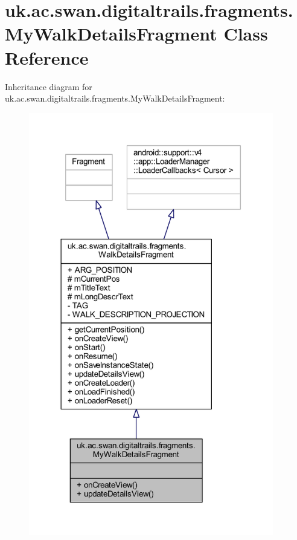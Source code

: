 \hypertarget{classuk_1_1ac_1_1swan_1_1digitaltrails_1_1fragments_1_1_my_walk_details_fragment}{\section{uk.\+ac.\+swan.\+digitaltrails.\+fragments.\+My\+Walk\+Details\+Fragment Class Reference}
\label{classuk_1_1ac_1_1swan_1_1digitaltrails_1_1fragments_1_1_my_walk_details_fragment}
}


Inheritance diagram for uk.\+ac.\+swan.\+digitaltrails.\+fragments.\+My\+Walk\+Details\+Fragment\+:
\nopagebreak
\begin{figure}[H]
\begin{center}
\leavevmode
\includegraphics[width=303pt]{classuk_1_1ac_1_1swan_1_1digitaltrails_1_1fragments_1_1_my_walk_details_fragment__inherit__graph}
\end{center}
\end{figure}


